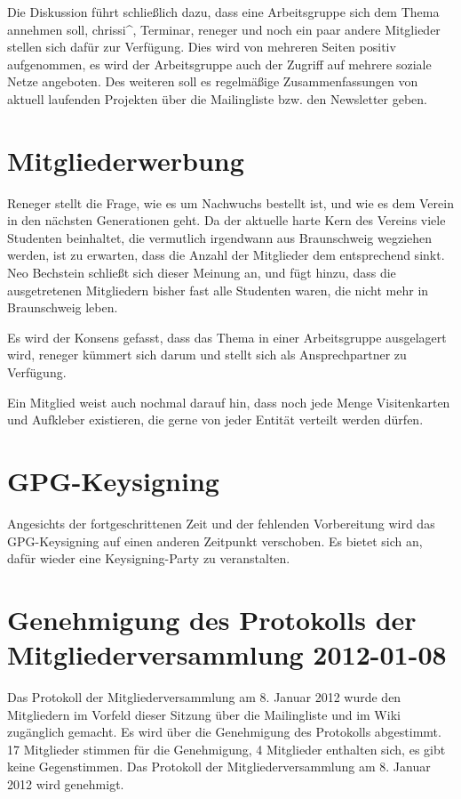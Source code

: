 \documentclass[a4paper,12pt]{scrartcl}
\begin{document}
Die Diskussion führt schließlich dazu, dass eine Arbeitsgruppe sich dem Thema
annehmen soll, chrissi\textasciicircum, Terminar, reneger und noch ein paar
andere Mitglieder stellen sich dafür zur Verfügung. Dies wird von mehreren
Seiten positiv aufgenommen, es wird der Arbeitsgruppe auch der Zugriff auf
mehrere soziale Netze angeboten. Des weiteren soll es regelmäßige
Zusammenfassungen von aktuell laufenden Projekten über die Mailingliste bzw. den
Newsletter geben.

\section{Mitgliederwerbung}\label{top:mitgliederwerbung}
Reneger stellt die Frage, wie es um Nachwuchs bestellt ist, und wie es dem
Verein in den nächsten Generationen geht. Da der aktuelle harte Kern des Vereins
viele Studenten beinhaltet, die vermutlich irgendwann aus Braunschweig wegziehen
werden, ist zu erwarten, dass die Anzahl der Mitglieder dem entsprechend sinkt.
Neo Bechstein schließt sich dieser Meinung an, und fügt hinzu, dass die
ausgetretenen Mitgliedern bisher fast alle Studenten waren, die nicht mehr in
Braunschweig leben.

Es wird der Konsens gefasst, dass das Thema in einer Arbeitsgruppe ausgelagert
wird, reneger kümmert sich darum und stellt sich als Ansprechpartner zu
Verfügung.

Ein Mitglied weist auch nochmal darauf hin, dass noch jede Menge Visitenkarten
und Aufkleber existieren, die gerne von jeder Entität verteilt werden dürfen.

\section{GPG-Keysigning}
\postponed
Angesichts der fortgeschrittenen Zeit und der fehlenden Vorbereitung wird das
GPG-Keysigning auf einen anderen Zeitpunkt verschoben. Es bietet sich an, dafür
wieder eine Keysigning-Party zu veranstalten.

\section{Genehmigung des Protokolls der Mitgliederversammlung 2012-01-08}
Das Protokoll der Mitgliederversammlung am 8. Januar 2012 wurde den Mitgliedern
im Vorfeld dieser Sitzung über die Mailingliste und im Wiki zugänglich gemacht.
Es wird über die Genehmigung des Protokolls abgestimmt. 17 Mitglieder stimmen
für die Genehmigung, 4 Mitglieder enthalten sich, es gibt keine Gegenstimmen.
Das Protokoll der Mitgliederversammlung am 8. Januar 2012 wird genehmigt.
\end{document}
